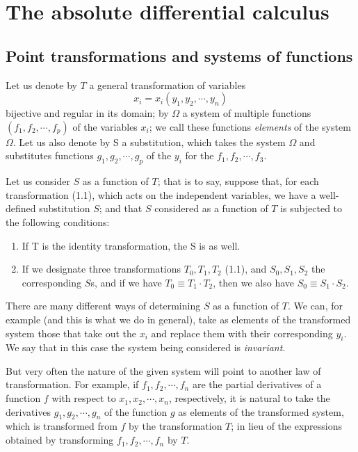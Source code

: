 \documentclass{book}
\begin{document}
\chapter{The absolute differential calculus}
\section{Point transformations and systems of functions}
Let us denote by $T$ a general transformation of variables
\begin{equation}
x_i=x_i(y_1,y_2,\cdots,y_n)
\end{equation}
bijective and regular in its domain; by $\Omega$ a system of multiple functions \\$(f_1,f_2,\cdots,f_p)$ of the variables $x_i$; we call these functions \emph{elements} of the system $\Omega$. Let us also denote by S a substitution, which takes the system $\Omega$ and substitutes functions $g_1,g_2,\cdots,g_p$ of the $y_i$ for the $f_1,f_2,\cdots,f_3$.

Let us consider $S$ as a function of $T$; that is to say, suppose that, for each transformation (1.1), which acts on the independent variables, we have a well-defined substitution $S$; and that $S$ considered as a function of $T$ is subjected to the following conditions:
\begin{enumerate}
	\item
	If T is the identity transformation, the S is as well.
	\item
	If we designate three transformations $T_0,T_1,T_2$ (1.1), and $S_0,S_1,S_2$ the corresponding $S$s, and if we have $T_0\equiv T_1\cdot T_2$, then we also have $S_0\equiv S_1\cdot S_2$.
\end{enumerate}
There are many different ways of determining $S$ as a function of $T$. We can, for example (and this is what we do in general), take as elements of the transformed system those that take out the $x_i$ and replace them with their corresponding $y_i$. We say that in this case the system being considered is \emph{invariant}.

But very often the nature of the given system will point to another law of transformation. For example, if $f_1,f_2,\cdots,f_n$ are the partial derivatives of a function $f$ with respect to $x_1,x_2,\cdots,x_n$, respectively, it is natural to take the derivatives $g_1,g_2,\cdots,g_n$ of the function $g$ as elements of the transformed system, which is transformed from $f$ by the transformation $T$; in lieu of the expressions obtained by transforming $f_1,f_2,\cdots,f_n$ by $T$.
\end{document}
